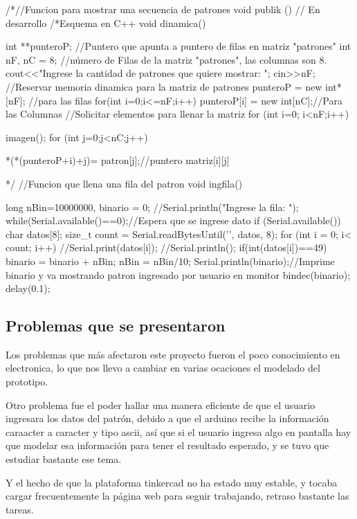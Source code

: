 \documentclass{article}
\begin{document}
/*//Funcion para mostrar una secuencia de patrones
void publik (){ }// En desarrollo
/*Esquema en C++
void dinamica(){
    int **punteroP; //Puntero que apunta a puntero de filas en matriz "patrones"
    int nF, nC = 8; //número de Filas de la matriz "patrones", las columnas son 8.
    cout<<"Ingrese la cantidad de patrones que quiere mostrar: ";
    cin>>nF;
    //Reservar memoria dinamica para la matriz de patrones
    punteroP = new int*[nF]; //para las filas
    for(int i=0;i<=nF;i++){
        punteroP[i] = new int[nC];//Para las Columnas
      }
    //Solicitar elementos para llenar la matriz
    for (int i=0; i<nF;i++){
        imagen();
        for (int j=0;j<nC;j++){
            *(*(punteroP+i)+j)= patron[j];//puntero matriz[i][j]

        }
    }
}*/
//Funcion que llena una fila del patron
void ingfila()
{
	long nBin=10000000, binario = 0;
  	//Serial.println("Ingrese la fila: ");
 	while(Serial.available()==0){};//Espera que se ingrese dato
 	if (Serial.available())
   	{
      char datos[8];
      size_t count = Serial.readBytesUntil('\n', datos, 8);
      for (int i = 0; i< count; i++) 
      {
        //Serial.print(datos[i]);
        //Serial.println();
        if(int(datos[i])==49)
        {
          binario = binario + nBin;
        }
         nBin = nBin/10;  
	}
   Serial.println(binario);//Imprime binario y va mostrando patron ingresado por usuario en monitor
   bindec(binario);   
   }
  delay(0.1);
  
} 

\subsection{Problemas que se presentaron}

Los problemas que más afectaron este proyecto fueron el poco conocimiento en electronica, lo que nos llevo a cambiar en varias ocaciones el modelado del prototipo.
 
 \vspace{1.5cm}
 
 Otro problema fue el poder hallar una manera eficiente de que el usuario ingresara los datos del patrón, debido a que el arduino recibe la información caraacter a caracter y tipo ascii, así que si el usuario ingresa algo en pantalla hay que modelar esa información para tener el resultado esperado, y se tuvo que estudiar bastante ese tema.
 
  \vspace{1.5cm}
 Y el hecho de que la plataforma tinkercad no ha estado muy estable, y tocaba cargar frecuentemente la página web para seguir trabajando, retraso bastante las tareas.
\end{document}
